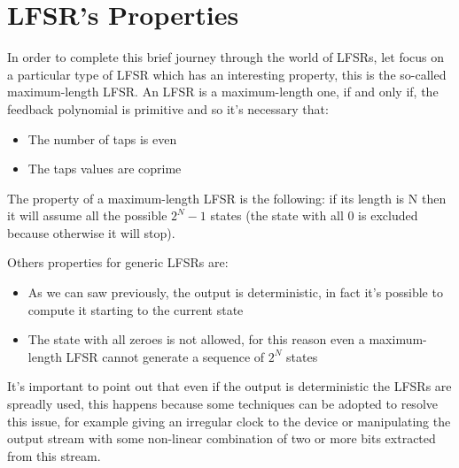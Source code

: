 \documentclass[a4paper]{report}
\begin{document}
\section{LFSR's Properties}
In order to complete this brief journey through the world of LFSRs, let focus on a particular type of LFSR which has an interesting property, this is the so-called maximum-length LFSR. An LFSR is a maximum-length one, if and only if, the feedback polynomial is primitive and so it's necessary that:
\begin{itemize}
	\item The number of taps is even
	\item The taps values are coprime
\end{itemize}
The property of a maximum-length LFSR is the following: if its length is N then it will assume all the possible $2^N-1$ states (the state with all 0 is excluded because otherwise it will stop).

\noindent Others properties for generic LFSRs are:
\begin{itemize}
	\item As we can saw previously, the output is deterministic, in fact it's possible to compute it starting to the current state
	\item The state with all zeroes is not allowed, for this reason even a maximum-length LFSR cannot generate a sequence of $2^N$ states
\end{itemize}
It's important to point out that even if the output is deterministic the LFSRs are spreadly used, this happens because some techniques can be adopted to resolve this issue, for example giving an irregular clock to the device or manipulating the output stream with some non-linear combination of two or more bits extracted from this stream.
\end{document}
